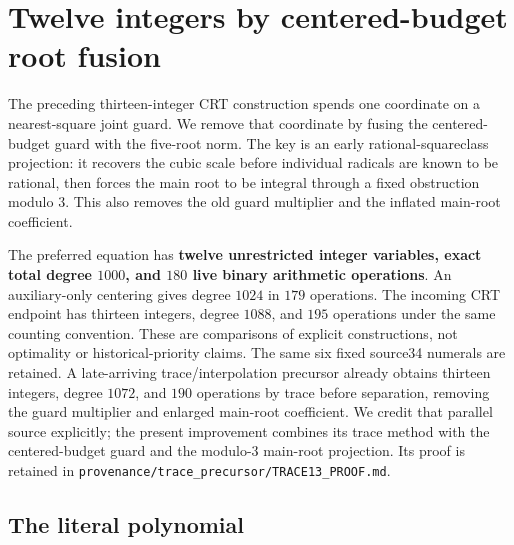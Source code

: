 \section{Twelve integers by centered-budget root fusion}
\label{sec:twelve-budget-fusion}

The preceding thirteen-integer CRT construction spends one coordinate on a
nearest-square joint guard. We remove that coordinate by fusing the
centered-budget guard with the five-root norm. The key is an early
rational-squareclass projection: it recovers the cubic scale before
individual radicals are known to be rational, then forces the main root
to be integral through a fixed obstruction modulo $3$. This also removes
the old guard multiplier and the inflated main-root coefficient.

The preferred equation has \textbf{twelve unrestricted integer variables,
exact total degree $1000$, and $180$ live binary arithmetic operations}.
An auxiliary-only centering gives degree $1024$ in $179$ operations.
The incoming CRT endpoint has thirteen integers, degree $1088$, and $195$
operations under the same counting convention. These are comparisons of
explicit constructions, not optimality or historical-priority claims.
The same six fixed source34 numerals are retained.
A late-arriving trace/interpolation precursor already obtains thirteen
integers, degree $1072$, and $190$ operations by trace before separation,
removing the guard multiplier and enlarged main-root coefficient.
We credit that parallel source explicitly; the present improvement
combines its trace method with the centered-budget guard and the
modulo-$3$ main-root projection. Its proof is retained in
\texttt{provenance/trace\_precursor/TRACE13\_PROOF.md}.

\subsection{The literal polynomial}


